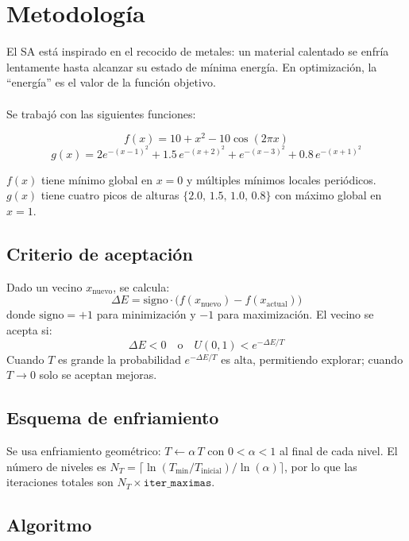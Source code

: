 \documentclass[11pt]{article}
\begin{document}
\section{Metodolog\'ia}

El SA est\'a inspirado en el recocido de metales: un material calentado se enfr\'ia lentamente hasta alcanzar su estado de m\'inima energ\'ia. En optimizaci\'on, la ``energ\'ia'' es el valor de la funci\'on objetivo.\\\\
Se trabaj\'o con las siguientes funciones:

\[
f(x) = 10 + x^2 - 10\cos(2\pi x)
\]
\[
g(x) = 2e^{-(x-1)^2} + 1.5\,e^{-(x+2)^2} + e^{-(x-3)^2} + 0.8\,e^{-(x+1)^2}
\]

$f(x)$ tiene m\'inimo global en $x=0$ y m\'ultiples m\'inimos locales peri\'odicos. $g(x)$ tiene cuatro picos de alturas $\{2.0,\,1.5,\,1.0,\,0.8\}$ con m\'aximo global en $x=1$.

\subsection{Criterio de aceptaci\'on}

Dado un vecino $x_{\text{nuevo}}$, se calcula:
\[
\Delta E = \text{signo} \cdot \bigl(f(x_{\text{nuevo}}) - f(x_{\text{actual}})\bigr)
\]
donde $\text{signo} = +1$ para minimizaci\'on y $-1$ para maximizaci\'on. El vecino se acepta si:
\[
\Delta E < 0 \quad \text{o} \quad U(0,1) < e^{-\Delta E / T}
\]
Cuando $T$ es grande la probabilidad $e^{-\Delta E/T}$ es alta, permitiendo explorar; cuando $T \to 0$ solo se aceptan mejoras.

\subsection{Esquema de enfriamiento}

Se usa enfriamiento geom\'etrico: $T \leftarrow \alpha\, T$ con $0 < \alpha < 1$ al final de cada nivel. El n\'umero de niveles es $N_T = \lceil \ln(T_{\min}/T_{\text{inicial}}) / \ln(\alpha) \rceil$, por lo que las iteraciones totales son $N_T \times \texttt{iter\_maximas}$.

\subsection{Algoritmo}
\end{document}
